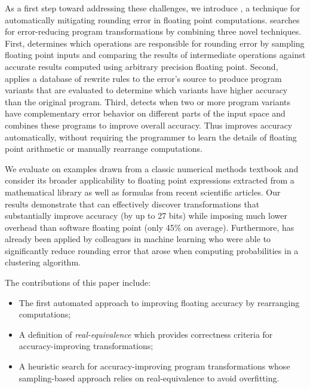 \documentclass[paper.tex]{subfiles}
\begin{document}
As a first step toward addressing these challenges, we introduce
\casio, a technique for automatically mitigating rounding error in
floating point computations.  \casio searches for error-reducing
program transformations by combining three novel techniques.  First,
\casio determines which operations are responsible for rounding error
by sampling floating point inputs and comparing the results of
intermediate operations against accurate results computed using
arbitrary precision floating point.  Second, \casio applies a database
of rewrite rules to the error's source to produce program variants
that are evaluated to determine which variants have higher accuracy
than the original program. Third, \casio detects when two or more
program variants have complementary error behavior on different parts
of the input space and combines these programs to improve overall
accuracy. Thus \casio improves accuracy automatically, without
requiring the programmer to learn the details of floating point
arithmetic or manually rearrange computations.

We evaluate \casio on examples drawn from a classic numerical methods
textbook and consider its broader applicability to floating point
expressions extracted from a mathematical library as well as formulas
from recent scientific articles.  Our results demonstrate that \casio
can effectively discover transformations that substantially improve
accuracy (by up to 27 bits) while imposing much lower overhead than
software floating point (only 45\% on average).  Furthermore, \casio
has already been applied by colleagues in machine learning who were
able to significantly reduce rounding error that arose when computing
probabilities in a clustering algorithm.

\medskip

\noindent The contributions of this paper include:
\begin{itemize}
\item The first automated approach to improving floating accuracy by
  rearranging computations;
\item A definition of \textit{real-equivalence} which provides
  correctness criteria for accuracy-improving transformations;
\item A heuristic search for accuracy-improving program
  transformations whose sampling-based approach relies on
  real-equivalence to avoid overfitting.
\end{itemize}

\end{document}
